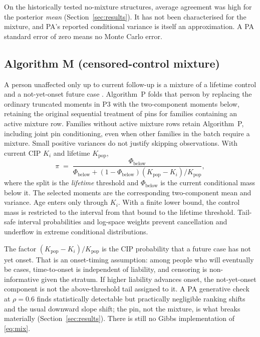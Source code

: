\documentclass[11pt,a4paper]{article}
\begin{document}
On the historically tested no-mixture structures, average agreement
was high for the posterior \emph{mean}
(Section~\ref{sec:results}).
It has not been characterised for the mixture, and PA's reported
conditional variance is itself an approximation.
A PA standard error of zero means no Monte Carlo error.

\subsection{Algorithm M (censored-control mixture)}
\label{sec:mixture}

A person unaffected only up to current follow-up is a mixture of a
lifetime control and a not-yet-onset future case \cite{krebs2024}.
Algorithm~P folds that person by replacing the ordinary truncated
moments in P3 with the two-component moments below, retaining the original
sequential treatment of pins for families containing an active mixture row.
Families without active mixture rows retain Algorithm~P, including joint pin
conditioning, even when other families in the batch require a mixture.
Small positive variances do not justify skipping observations.
With current CIP $K_i$ and lifetime $K_{\mathrm{pop}}$,
\begin{equation}
  \pi
  \;=\;
  \frac{\Phi_{\mathrm{below}}}
       {\Phi_{\mathrm{below}}+(1-\Phi_{\mathrm{below}})
        (K_{\mathrm{pop}}-K_i)/K_{\mathrm{pop}}},
  \label{eq:mix}
\end{equation}
where the split is the \emph{lifetime} threshold and
$\Phi_{\mathrm{below}}$ is the current conditional mass below it.
The selected moments are the corresponding two-component mean and
variance.
Age enters only through $K_i$.
With a finite lower bound, the control mass is restricted to the interval
from that bound to the lifetime threshold. Tail-safe interval probabilities
and log-space weights prevent cancellation and underflow in extreme
conditional distributions.

The factor $(K_{\mathrm{pop}}-K_i)/K_{\mathrm{pop}}$ is the CIP
probability that a future case has not yet onset.
That is an onset-timing assumption: among people who will
eventually be cases, time-to-onset is independent of liability,
and censoring is non-informative given the stratum.
If higher liability advances onset, the not-yet-onset component is
not the above-threshold tail assigned to it.
A PA generative check at $\rho=0.6$ finds statistically detectable
but practically negligible ranking shifts and the usual downward
slope shift; the pin, not the mixture, is what breaks materially
(Section~\ref{sec:results}).
There is still no Gibbs implementation of \eqref{eq:mix}.
\end{document}
